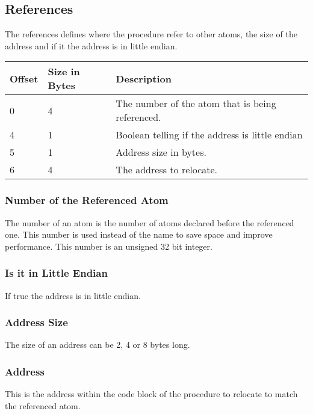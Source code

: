 \subsection{References}
The references defines where the procedure refer to other atoms, the size of the 
address and if it the address is in little endian.

\begin{table}[h]
    \centering
    \label{tbl:reference}
    \begin{tabular}{|l|l|l|}
        \hline
        \textbf{Offset} & \textbf{Size in Bytes} & \textbf{Description}                             \\ \hline
        0               & 4                      & The number of the atom that is being referenced. \\ \hline
        4               & 1                      & Boolean telling if the address is little endian  \\ \hline
        5               & 1                      & Address size in bytes.                           \\ \hline
        6               & 4                      & The address to relocate.                         \\ \hline
    \end{tabular}
\end{table}

\subsubsection{Number of the Referenced Atom}
The number of an atom is the number of atoms declared before the referenced one.
This number is used instead of the name to save space and improve performance. 
This number is an unsigned 32 bit integer.

\subsubsection{Is it in Little Endian}
If true the address is in little endian.

\subsubsection{Address Size}
The size of an address can be 2, 4 or 8 bytes long.

\subsubsection{Address}
This is the address within the code block of the procedure to relocate to match
the referenced atom.